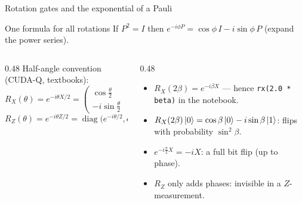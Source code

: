 \documentclass[aspectratio=169,11pt]{beamer}
\begin{document}
\begin{frame}{Rotation gates and the exponential of a Pauli}
  \begin{block}{One formula for all rotations}
    If $P^2 = I$ then \quad $e^{-i\phi P} = \cos\phi\, I - i\sin\phi\, P$ \quad (expand the power series).
  \end{block}
  \begin{columns}[T]
    \begin{column}{0.48\textwidth}
      Half-angle convention (CUDA-Q, textbooks):
      \[ R_X(\theta) = e^{-i\theta X/2} = \begin{pmatrix}\cos\frac\theta2 & -i\sin\frac\theta2\\ -i\sin\frac\theta2 & \cos\frac\theta2\end{pmatrix} \]
      \[ R_Z(\theta) = e^{-i\theta Z/2} = \operatorname{diag}\big(e^{-i\theta/2}, e^{i\theta/2}\big) \]
    \end{column}
    \begin{column}{0.48\textwidth}
      \begin{itemize}
        \item $R_X(2\beta) = e^{-i\beta X}$ --- hence \texttt{rx(2.0 * beta)} in the notebook.
        \item $R_X(2\beta)\ket0 = \cos\beta\ket0 - i\sin\beta\ket1$: flips with probability $\sin^2\beta$.
        \item $e^{-i\frac\pi2X} = -iX$: a full bit flip (up to phase).
        \item $R_Z$ only adds phases: invisible in a $Z$-measurement.
      \end{itemize}
    \end{column}
  \end{columns}
\end{frame}
\end{document}
